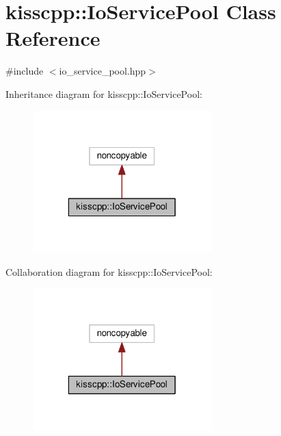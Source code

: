 \hypertarget{a00029}{\section{kisscpp\-:\-:Io\-Service\-Pool Class Reference}
\label{a00029}
}


{\ttfamily \#include $<$io\-\_\-service\-\_\-pool.\-hpp$>$}



Inheritance diagram for kisscpp\-:\-:Io\-Service\-Pool\-:\nopagebreak
\begin{figure}[H]
\begin{center}
\leavevmode
\includegraphics[width=196pt]{a00146}
\end{center}
\end{figure}


Collaboration diagram for kisscpp\-:\-:Io\-Service\-Pool\-:\nopagebreak
\begin{figure}[H]
\begin{center}
\leavevmode
\includegraphics[width=196pt]{a00147}
\end{center}
\end{figure}
